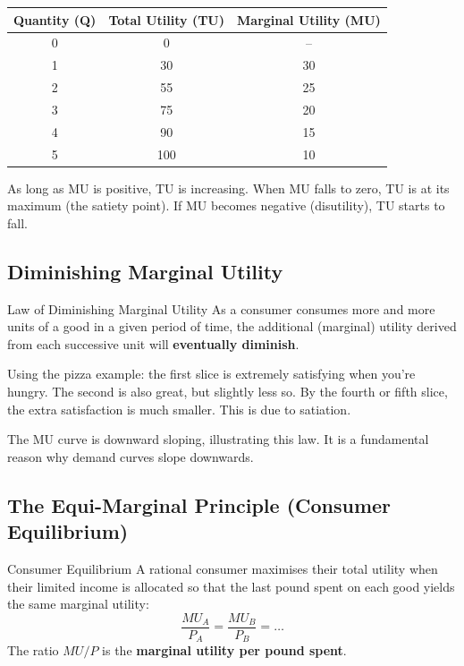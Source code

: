 \documentclass[11pt, a4paper, twoside]{book}
\begin{document}
\begin{example}
\begin{tabular}{@{}ccc@{}}
\textbf{Quantity (Q)} & \textbf{Total Utility (TU)} & \textbf{Marginal Utility (MU)} \\
\midrule
0 & 0  & -- \\
1 & 30 & 30 \\
2 & 55 & 25 \\
3 & 75 & 20 \\
4 & 90 & 15 \\
5 & 100 & 10 \\
\end{tabular}
\end{example}

\begin{coreidea}
As long as MU is positive, TU is increasing. When MU falls to zero, TU is at its maximum (the satiety point). If MU becomes negative (disutility), TU starts to fall.
\end{coreidea}

\subsection{Diminishing Marginal Utility}

\begin{keyterm}{Law of Diminishing Marginal Utility}
As a consumer consumes more and more units of a good in a given period of time, the additional (marginal) utility derived from each successive unit will \textbf{eventually diminish}.
\end{keyterm}

Using the pizza example: the first slice is extremely satisfying when you're hungry. The second is also great, but slightly less so. By the fourth or fifth slice, the extra satisfaction is much smaller. This is due to satiation.

The MU curve is downward sloping, illustrating this law. It is a fundamental reason why demand curves slope downwards.

\subsection{The Equi-Marginal Principle (Consumer Equilibrium)}

\begin{keyterm}{Consumer Equilibrium}
A rational consumer maximises their total utility when their limited income is allocated so that the last pound spent on each good yields the same marginal utility:
\[ \frac{MU_A}{P_A} = \frac{MU_B}{P_B} = \ldots \]
The ratio $MU/P$ is the \textbf{marginal utility per pound spent}.
\end{keyterm}
\end{document}
